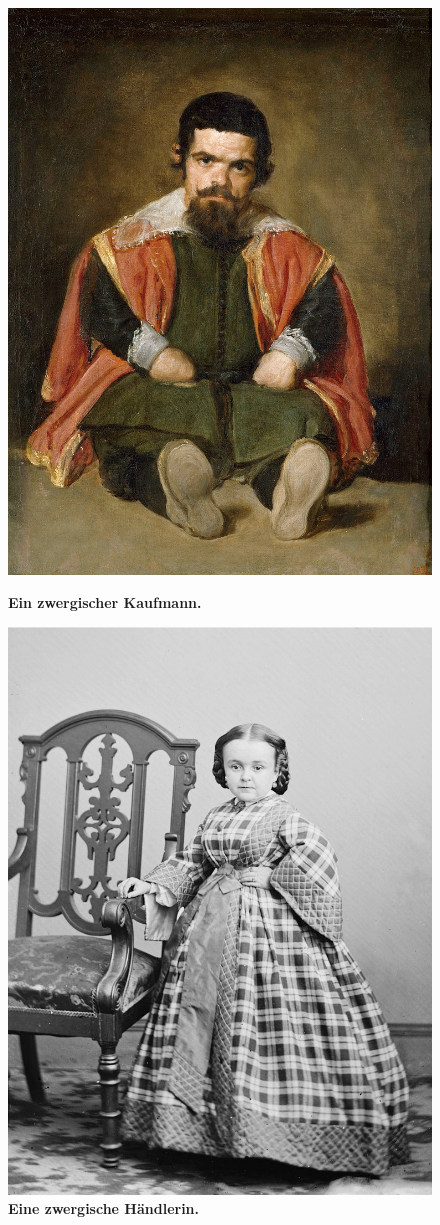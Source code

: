 \begin{figure}
	\begin{minipage}{0.49\textwidth}
		\centering
		\includegraphics[width=0.8\linewidth]{Abbildungen/Weltenbau/Lebensformen/ZwergKaufmann.png}
		\caption{\textbf{Ein zwergischer Kaufmann.}}
		\label{fig:zwergkaufmann}
	\end{minipage}
	\hfill
	\begin{minipage}{0.49\textwidth}
		\centering
		\includegraphics[width=0.8\linewidth]{Abbildungen/Weltenbau/Lebensformen/ZwergHaendlerin.png}
		\caption{\textbf{Eine zwergische Händlerin.}}
		\label{fig:zwerghaendlerin}
	\end{minipage}
\end{figure}

